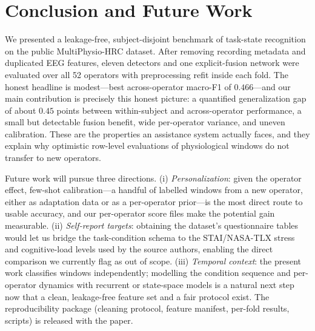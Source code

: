 \documentclass{llncs}
\begin{document}
\section{Conclusion and Future Work}
\label{sec:conclusion}

We presented a leakage-free, subject-disjoint benchmark of task-state recognition on
the public MultiPhysio-\ac{HRC} dataset. After removing recording metadata and
duplicated \ac{EEG} features, eleven detectors and one explicit-fusion network were
evaluated over all 52 operators with preprocessing refit inside each fold. The honest
headline is modest---best across-operator macro-F1 of $0.466$---and our main
contribution is precisely this honest picture: a quantified generalization gap of
about $0.45$ points between within-subject and across-operator performance, a
small but detectable fusion benefit, wide per-operator variance, and uneven
calibration.
These are the properties an assistance system actually faces, and they explain why
optimistic row-level evaluations of physiological windows do not transfer to new
operators.

Future work will pursue three directions. (i) \emph{Personalization}: given the
operator effect, few-shot calibration---a handful of labelled windows from a new
operator, either as adaptation data or as a per-operator prior---is the most direct
route to usable accuracy, and our per-operator score files make the potential gain
measurable. (ii) \emph{Self-report targets}: obtaining the dataset's questionnaire
tables would let us bridge the task-condition schema to the STAI/NASA-TLX
stress and cognitive-load levels used by the source authors, enabling the direct
comparison we currently flag as out of scope. (iii) \emph{Temporal context}: the
present work classifies windows independently; modelling the condition sequence and
per-operator dynamics with recurrent or state-space models is a natural next step now
that a clean, leakage-free feature set and a fair protocol exist. The reproducibility
package (cleaning protocol, feature manifest, per-fold results, scripts) is released
with the paper.



\end{document}
